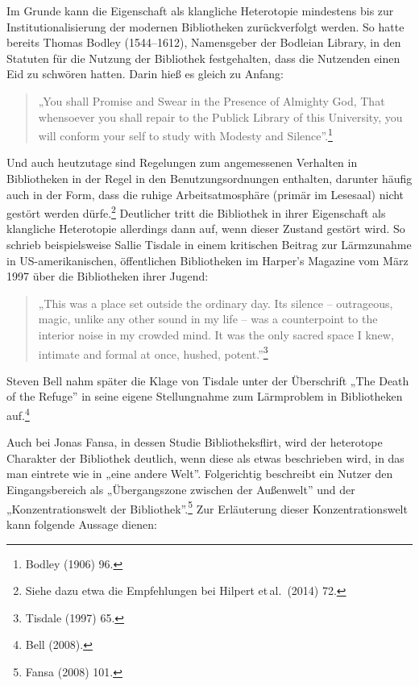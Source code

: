 \documentclass[a4paper,
fontsize=11pt,
oneside,
numbers=noperiodatend,
parskip=half-,
bibliography=totoc,
final
]{scrartcl}
\begin{document}
Im Grunde kann die Eigenschaft als klangliche Heterotopie mindestens bis
zur Institutionalisierung der modernen Bibliotheken zurückverfolgt
werden. So hatte bereits Thomas Bodley (1544--1612), Namensgeber der
Bodleian Library, in den Statuten für die Nutzung der Bibliothek
festgehalten, dass die Nutzenden einen Eid zu schwören hatten. Darin
hieß es gleich zu Anfang:

\begin{quote}
„You shall Promise and Swear in the Presence of Almighty God, That
whensoever you shall repair to the Publick Library of this University,
you will conform your self to study with Modesty and
Silence''.\footnote{Bodley (1906) 96.}
\end{quote}

Und auch heutzutage sind Regelungen zum angemessenen Verhalten in
Bibliotheken in der Regel in den Benutzungsordnungen enthalten, darunter
häufig auch in der Form, dass die ruhige Arbeitsatmosphäre (primär im
Lesesaal) nicht gestört werden dürfe.\footnote{Siehe dazu etwa die
  Empfehlungen bei Hilpert et\,al.~(2014) 72.} Deutlicher tritt die
Bibliothek in ihrer Eigenschaft als klangliche Heterotopie allerdings
dann auf, wenn dieser Zustand gestört wird. So schrieb beispielsweise
Sallie Tisdale in einem kritischen Beitrag zur Lärmzunahme in
US-amerikanischen, öffentlichen Bibliotheken im Harper's Magazine vom
März 1997 über die Bibliotheken ihrer Jugend:

\begin{quote}
„This was a place set outside the ordinary day. Its silence --
outrageous, magic, unlike any other sound in my life -- was a
counterpoint to the interior noise in my crowded mind. It was the only
sacred space I knew, intimate and formal at once, hushed,
potent.''\footnote{Tisdale (1997) 65.}
\end{quote}

Steven Bell nahm später die Klage von Tisdale unter der Überschrift „The
Death of the Refuge'' in seine eigene Stellungnahme zum Lärmproblem in
Bibliotheken auf.\footnote{Bell (2008).}

Auch bei Jonas Fansa, in dessen Studie Bibliotheksflirt, wird der
heterotope Charakter der Bibliothek deutlich, wenn diese als etwas
beschrieben wird, in das man eintrete wie in „eine andere Welt''.
Folgerichtig beschreibt ein Nutzer den Eingangsbereich als
„Übergangszone zwischen der Außenwelt'' und der „Konzentrationswelt der
Bibliothek''.\footnote{Fansa (2008) 101.} Zur Erläuterung dieser
Konzentrationswelt kann folgende Aussage dienen:
\end{document}

